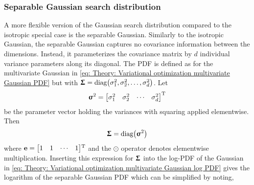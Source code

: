 \subsubsection{Separable Gaussian search distribution}\label{sec: Theory: Variational optimization: Separable Gaussian search distribution}
A more flexible version of the Gaussian search distribution compared to the isotropic special case is the separable Gaussian. Similarly to the isotropic Gaussian, the separable Gaussian captures no covariance information between the dimensions. Instead, it parameterizes the covariance matrix by $d$ individual variance parameters along its diagonal. The \gls{PDF} is defined as for the multivariate Gaussian in \eqref{eq: Theory: Variational optimization multivariate Gaussian PDF} but with ${\boldsymbol{\Upsigma}}=\text{diag}{\left(\sigma_1^2, \sigma_2^2, \dots, \sigma_d^2\right)}$. Let
\begin{equation}
    {\boldsymbol{\upsigma}}^2 = {\begin{bmatrix}\sigma_1^2 & \sigma_2^2 & \cdots & \sigma_d^2\end{bmatrix}}^\text{T}
\end{equation}
be the parameter vector holding the variances with squaring applied elementwise. Then
\begin{equation}\label{eq: Theory: Variational optimization separable Gaussian Sigma matrix simplification}
    \Sigmab = \text{diag}\pa{\sigmab^2}%
\end{equation}
where ${\mathbf{e}}={\begin{bmatrix}1&1&\cdots&1\end{bmatrix}}{^\mathrm{T}}$ and the $\odot$ operator denotes elementwise multiplication. Inserting this expression for ${\boldsymbol{\Upsigma}}$ into the log-\gls{PDF} of the Gaussian in \eqref{eq: Theory: Variational optimization multivariate Gaussian log PDF} gives the logarithm of the separable Gaussian \gls{PDF} which can be simplified by noting,
